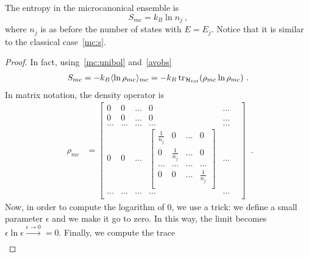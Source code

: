     The entropy in the microcanonical ensemble is 
    \begin{equation*}
        S_{mc} = k_B \ln n_j ~,
    \end{equation*}
    where $n_j$ is as before the number of states with $E = E_j$. Notice that it is similar to the classical case~\eqref{mc:s}.
    \begin{proof}
        In fact, using~\eqref{mc:unibol} and~\eqref{avobs}
        \begin{equation*}
        \begin{aligned}
            S_{mc} = - k_B \langle\ln \rho_{mc}\rangle_{mc} = - k_B \operatorname{tr}_{\mathcal H_{tot}} ( \rho_{mc} \ln \rho_{mc}) ~.
        \end{aligned}
        \end{equation*}
        In matrix notation, the density operator is 
        \begin{equation*}
        \begin{aligned}
            \rho_{mc} & = \begin{bmatrix}
                0 & 0 & \ldots & 0 & \ldots \\ 
                0 & 0 & \ldots & 0 & \ldots \\ 
                \ldots & \ldots & \ldots & \ldots & \ldots & \\
                0 & 0 & \ldots & \begin{bmatrix}
                    \frac{1}{n_j} & 0 & \ldots & 0 \\
                    0 & \frac{1}{n_j} & \ldots & 0 \\
                    \ldots & \ldots & \ldots & \ldots \\
                    0 & 0 & \ldots & \frac{1}{n_j} \\
                \end{bmatrix} & \ldots & \\
                \ldots & \ldots & \ldots & \ldots & \ldots  \\
            \end{bmatrix}
        \end{aligned} ~.
        \end{equation*}
        Now, in order to compute the logarithm of $0$, we use a trick: we define a small parameter $\epsilon$ and we make it go to zero. In this way, the limit becomes $\epsilon \ln \epsilon \xrightarrow{\epsilon \rightarrow 0} = 0$. Finally, we compute the trace 
        \begin{equation*}
        \begin{aligned}

\end{aligned}
\end{equation*}
\end{proof}
